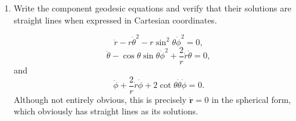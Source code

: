\begin{enumerate}[label=\alph*)]
    \item Write the component geodesic equations and verify that their solutions
    are straight lines when expressed in Cartesian coordinates.
    \begin{solution}
        \begin{equation}
            \ddot r -r\dot\theta^2 -r\sin^2\theta\dot\phi^2 = 0,
        \end{equation}
        \begin{equation}
            \ddot \theta -\cos\theta\sin\theta\dot\phi^2 + \frac{2}{r}\dot r\dot \theta = 0,
        \end{equation}
        and
        \begin{equation}
            \ddot \phi + \frac{2}{r}\dot r \dot \phi + 2\cot\theta \dot \theta \dot \phi  = 0.
        \end{equation}
        Although not entirely obvious, this is precisely $\ddot {\mathbf{r}} = 0$ in the spherical form, which obviously has straight lines as its solutions.
    \end{solution}
\end{enumerate}
